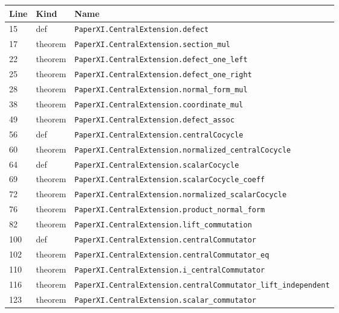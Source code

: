 \documentclass[10pt,oneside]{book}
\begin{document}
\begin{longtable}{@{}p{}p{}p{}@{}}\toprule Line&Kind&Name\\\midrule\endhead

15&def&\nolinkurl{PaperXI.CentralExtension.defect}\\

17&theorem&\nolinkurl{PaperXI.CentralExtension.section_mul}\\

22&theorem&\nolinkurl{PaperXI.CentralExtension.defect_one_left}\\

25&theorem&\nolinkurl{PaperXI.CentralExtension.defect_one_right}\\

28&theorem&\nolinkurl{PaperXI.CentralExtension.normal_form_mul}\\

38&theorem&\nolinkurl{PaperXI.CentralExtension.coordinate_mul}\\

49&theorem&\nolinkurl{PaperXI.CentralExtension.defect_assoc}\\

56&def&\nolinkurl{PaperXI.CentralExtension.centralCocycle}\\

60&theorem&\nolinkurl{PaperXI.CentralExtension.normalized_centralCocycle}\\

64&def&\nolinkurl{PaperXI.CentralExtension.scalarCocycle}\\

69&theorem&\nolinkurl{PaperXI.CentralExtension.scalarCocycle_coeff}\\

72&theorem&\nolinkurl{PaperXI.CentralExtension.normalized_scalarCocycle}\\

76&theorem&\nolinkurl{PaperXI.CentralExtension.product_normal_form}\\

82&theorem&\nolinkurl{PaperXI.CentralExtension.lift_commutation}\\

100&def&\nolinkurl{PaperXI.CentralExtension.centralCommutator}\\

102&theorem&\nolinkurl{PaperXI.CentralExtension.centralCommutator_eq}\\

110&theorem&\nolinkurl{PaperXI.CentralExtension.i_centralCommutator}\\

116&theorem&\nolinkurl{PaperXI.CentralExtension.centralCommutator_lift_independent}\\

123&theorem&\nolinkurl{PaperXI.CentralExtension.scalar_commutator}\\

\bottomrule\end{longtable}
\end{document}
